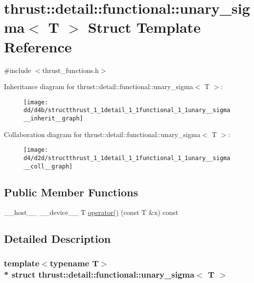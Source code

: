 \hypertarget{structthrust_1_1detail_1_1functional_1_1unary__sigma}{}\section{thrust\+:\+:detail\+:\+:functional\+:\+:unary\+\_\+sigma$<$ T $>$ Struct Template Reference}
\label{structthrust_1_1detail_1_1functional_1_1unary__sigma}


{\ttfamily \#include $<$thrust\+\_\+functions.\+h$>$}



Inheritance diagram for thrust\+:\+:detail\+:\+:functional\+:\+:unary\+\_\+sigma$<$ T $>$\+:
\nopagebreak
\begin{figure}[H]
\begin{center}
\leavevmode
\texttt{[image: dd/d4b/structthrust\_1\_1detail\_1\_1functional\_1\_1unary\_\_sigma\_\_inherit\_\_graph]}
\end{center}
\end{figure}


Collaboration diagram for thrust\+:\+:detail\+:\+:functional\+:\+:unary\+\_\+sigma$<$ T $>$\+:
\nopagebreak
\begin{figure}[H]
\begin{center}
\leavevmode
\texttt{[image: d4/d2d/structthrust\_1\_1detail\_1\_1functional\_1\_1unary\_\_sigma\_\_coll\_\_graph]}
\end{center}
\end{figure}
\subsection*{Public Member Functions}
\begin{DoxyCompactItemize}
\item 
\+\_\+\+\_\+host\+\_\+\+\_\+ \+\_\+\+\_\+device\+\_\+\+\_\+ T \hyperlink{structthrust_1_1detail_1_1functional_1_1unary__sigma_a3885e710930afef7791953efafc735e8}{operator()} (const T \&x) const 
\end{DoxyCompactItemize}


\subsection{Detailed Description}
\subsubsection*{template$<$typename T$>$\\*
struct thrust\+::detail\+::functional\+::unary\+\_\+sigma$<$ T $>$}



